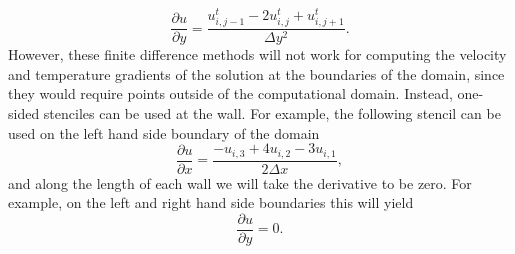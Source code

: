 \begin{equation}
	\frac{\partial u}{\partial y} = \frac{u_{i,j-1}^t - 2 u_{i,j}^t + u_{i,j+1}^t}{\Delta y^2}.
\end{equation}
However, these finite difference methods will not work for computing the velocity and temperature gradients of the solution at the boundaries of the domain, since they would require points outside of the computational domain. Instead, one-sided stenciles can be used at the wall. For example, the following stencil can be used on the left hand side boundary of the domain
\begin{equation}
	\frac{\partial u}{\partial x} = \frac{-u_{i,3} + 4u_{i,2} - 3u_{i,1}}{2\Delta x},
\end{equation}
and along the length of each wall we will take the derivative to be zero. For example, on the left and right hand side boundaries this will yield
\begin{equation}
	\frac{\partial u}{\partial y} = 0.
\end{equation}